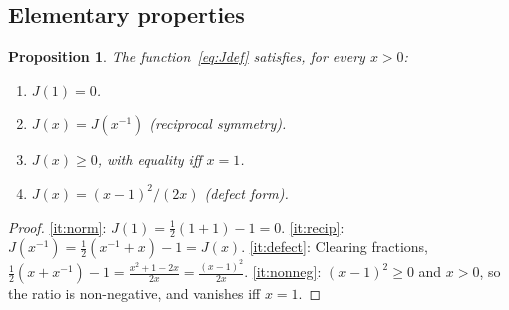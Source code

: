 \documentclass[11pt,reqno]{amsart}
\theoremstyle{plain}
\newtheorem{proposition}[theorem]{Proposition}
\theoremstyle{definition}
\theoremstyle{remark}
\newcommand{\Jcost}{J}
\newcommand{\1}{\mathbf{1}}
\begin{document}
\subsection{Elementary properties} \begin{proposition}\label{prop:J-props}
The function~\eqref{eq:Jdef} satisfies, for every $x>0$:
\begin{enumerate}[nosep,label=\textup{(\alph*)}]
\item\label{it:norm} $\Jcost(1)=0$.
\item\label{it:recip} $\Jcost(x)=\Jcost(x^{-1})$ \textup{(reciprocal symmetry)}.
\item\label{it:nonneg} $\Jcost(x)\ge0$, with equality iff $x=1$.
\item\label{it:defect} $\Jcost(x)=(x-1)^2/(2x)$ \textup{(defect form)}.
\end{enumerate}
\end{proposition}

\begin{proof}
\ref{it:norm}:
$\Jcost(1)=\frac12(1+1)-1=0$.
\ref{it:recip}:
$\Jcost(x^{-1})=\frac12(x^{-1}+x)-1=\Jcost(x)$.
\ref{it:defect}: Clearing fractions,
$\frac12(x+x^{-1})-1=\frac{x^2+1-2x}{2x}=\frac{(x-1)^2}{2x}$.
\ref{it:nonneg}: $(x-1)^2\ge0$ and $x>0$, so the ratio is
non-negative, and vanishes iff $x=1$.
\end{proof}
\end{document}
